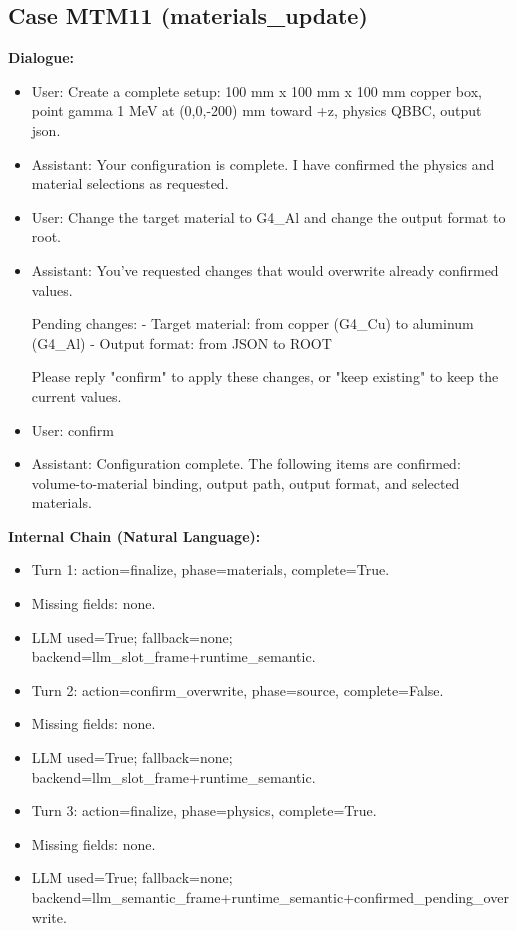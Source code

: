 \documentclass[11pt]{ctexart}
\begin{document}
\subsection{Case MTM11 (materials\_update)}
\textbf{Dialogue:}
\begin{itemize}
\item User: Create a complete setup: 100 mm x 100 mm x 100 mm copper box, point gamma 1 MeV at (0,0,-200) mm toward +z, physics QBBC, output json.
\item Assistant: Your configuration is complete. I have confirmed the physics and material selections as requested.
\item User: Change the target material to G4\_Al and change the output format to root.
\item Assistant: You've requested changes that would overwrite already confirmed values.

Pending changes:
- Target material: from copper (G4\_Cu) to aluminum (G4\_Al)
- Output format: from JSON to ROOT

Please reply "confirm" to apply these changes, or "keep existing" to keep the current values.
\item User: confirm
\item Assistant: Configuration complete. The following items are confirmed: volume-to-material binding, output path, output format, and selected materials.
\end{itemize}
\textbf{Internal Chain (Natural Language):}
\begin{itemize}
\item Turn 1: action=finalize, phase=materials, complete=True.
\item Missing fields: none.
\item LLM used=True; fallback=none; backend=llm\_slot\_frame+runtime\_semantic.
\item Turn 2: action=confirm\_overwrite, phase=source, complete=False.
\item Missing fields: none.
\item LLM used=True; fallback=none; backend=llm\_slot\_frame+runtime\_semantic.
\item Turn 3: action=finalize, phase=physics, complete=True.
\item Missing fields: none.
\item LLM used=True; fallback=none; backend=llm\_semantic\_frame+runtime\_semantic+confirmed\_pending\_overwrite.
\end{itemize}
\end{document}
